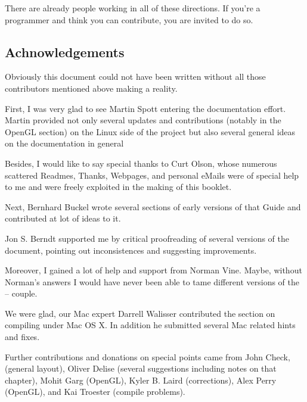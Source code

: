 There are already people working in all of these directions. If you're a programmer and
think you can contribute, you are invited to do so.

\subsection*{Achnowledgements}
Obviously this document could not have been written without all those contributors
mentioned above making \FlightGear{} a reality.

First, I was very glad to see Martin Spott  entering the documentation effort. Martin provided not only several updates and contributions (notably in the OpenGL section) on the Linux side of the project but also several general ideas on the documentation in general

Besides, I would like to say special thanks to Curt Olson, whose
numerous scattered Readmes, Thanks, Webpages, and personal eMails were of special help to
me and were freely exploited in the making of this booklet.

Next, Bernhard Buckel  wrote several sections of early versions
of that Guide and contributed at lot of ideas to it.

Jon S. Berndt  supported me by critical proofreading of several
versions of the document, pointing out inconsistences and suggesting improvements.

Moreover, I gained a lot of help and support from Norman Vine. Maybe,
without Norman's answers I would have never been able to tame different versions of the
\Cygwin{} -- \FlightGear{} couple.

We were glad, our Mac expert Darrell Walisser  contributed the section on compiling under Mac OS X. In addition he submitted several Mac related hints and fixes.

Further contributions and donations on special points came from John Check, (general layout), Oliver Delise  (several suggestions
including notes on that chapter), Mohit Garg  (OpenGL), Kyler B. Laird
 (corrections), Alex Perry (OpenGL), and Kai
Troester (compile problems).

